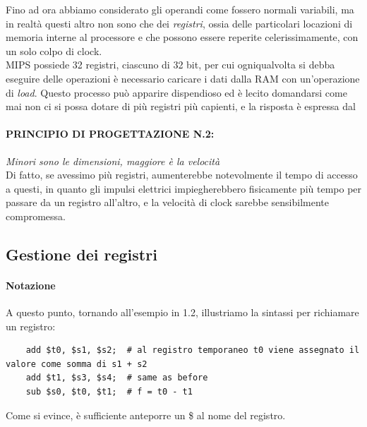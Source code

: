 \documentclass[class=book, crop=false]{standalone}
\begin{document}
Fino ad ora abbiamo considerato gli operandi come fossero normali variabili, ma in realtà questi altro non sono che dei \emph{registri}, ossia delle particolari locazioni di memoria interne al processore e che possono essere reperite celerissimamente, con un solo colpo di clock.\\
MIPS possiede 32 registri, ciascuno di 32 bit, per cui ogniqualvolta si debba eseguire delle operazioni è necessario caricare i dati dalla RAM con un'operazione di \emph{load}. Questo processo può apparire dispendioso ed è lecito domandarsi come mai non ci si possa dotare di più registri più capienti, e la risposta è espressa dal

\paragraph{PRINCIPIO DI PROGETTAZIONE N.2:}
\emph{Minori sono le dimensioni, maggiore è la velocità}\\

Di fatto, se avessimo  più registri, aumenterebbe notevolmente il tempo di accesso a questi, in quanto gli impulsi elettrici impiegherebbero fisicamente più tempo per passare da un registro all'altro, e la velocità di clock sarebbe sensibilmente compromessa.

\subsection{Gestione dei registri}

\paragraph{Notazione}
A questo punto, tornando all'esempio in 1.2, illustriamo la sintassi per richiamare un registro:
\begin{verbatim}
	add $t0, $s1, $s2;  # al registro temporaneo t0 viene assegnato il valore come somma di s1 + s2
	add $t1, $s3, $s4;  # same as before
	sub $s0, $t0, $t1;  # f = t0 - t1
\end{verbatim}
Come si evince, è sufficiente anteporre un \$ al nome del registro.
\end{document}
